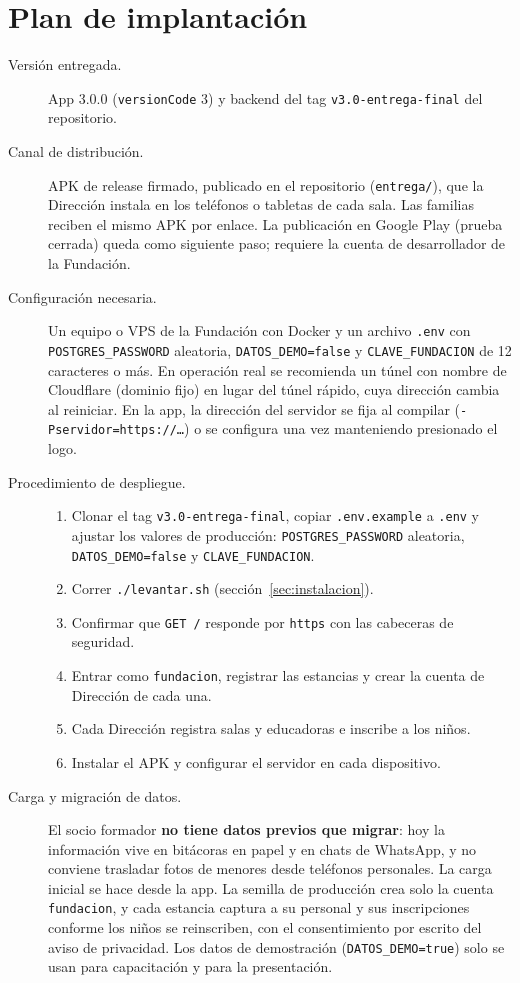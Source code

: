 \section{Plan de implantación}

\begin{description}
	\item[Versión entregada.] App 3.0.0 (\texttt{version\allowbreak{}Code} 3) y backend del tag \texttt{v3.\allowbreak{}0-entrega-final} del repositorio.
	\item[Canal de distribución.] APK de release firmado, publicado en el repositorio (\texttt{entrega/\allowbreak{}}), que la Dirección instala en los teléfonos o tabletas de cada sala. Las familias reciben el mismo APK por enlace. La publicación en Google Play (prueba cerrada) queda como siguiente paso; requiere la cuenta de desarrollador de la Fundación.
	\item[Configuración necesaria.] Un equipo o VPS de la Fundación con Docker y un archivo \texttt{.\allowbreak{}env} con \texttt{POSTGRES\_PASSWORD} aleatoria, \texttt{DATOS\_DEMO=false} y \texttt{CLAVE\_FUNDACION} de 12 caracteres o más. En operación real se recomienda un túnel con nombre de Cloudflare (dominio fijo) en lugar del túnel rápido, cuya dirección cambia al reiniciar. En la app, la dirección del servidor se fija al compilar (\texttt{-Pservidor=https:/\allowbreak{}/\allowbreak{}\ldots}) o se configura una vez manteniendo presionado el logo.
	\item[Procedimiento de despliegue.]
	\begin{enumerate}
		\item Clonar el tag \texttt{v3.0-entrega-final}, copiar \texttt{.env.example} a \texttt{.env} y ajustar los valores de producción: \texttt{POSTGRES\_PASSWORD} aleatoria, \texttt{DATOS\_DEMO=false} y \texttt{CLAVE\_FUNDACION}.
		\item Correr \texttt{./levantar.sh} (sección~\ref{sec:instalacion}).
		\item Confirmar que \texttt{GET /\allowbreak{}} responde por \texttt{https} con las cabeceras de seguridad.
		\item Entrar como \texttt{fundacion}, registrar las estancias y crear la cuenta de Dirección de cada una.
		\item Cada Dirección registra salas y educadoras e inscribe a los niños.
		\item Instalar el APK y configurar el servidor en cada dispositivo.
	\end{enumerate}
	\item[Carga y migración de datos.] El socio formador \textbf{no tiene datos previos que migrar}: hoy la información vive en bitácoras en papel y en chats de WhatsApp, y no conviene trasladar fotos de menores desde teléfonos personales. La carga inicial se hace desde la app. La semilla de producción crea solo la cuenta \texttt{fundacion}, y cada estancia captura a su personal y sus inscripciones conforme los niños se reinscriben, con el consentimiento por escrito del aviso de privacidad. Los datos de demostración (\texttt{DATOS\_DEMO=true}) solo se usan para capacitación y para la presentación.

\end{description}
